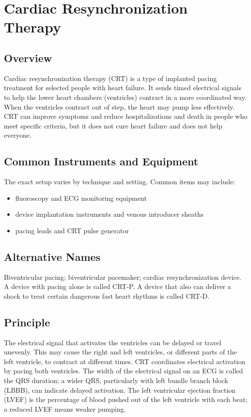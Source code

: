 \chapter{Cardiac Resynchronization Therapy}

\section*{Overview}
Cardiac resynchronization therapy (CRT) is a type of implanted pacing treatment for selected people with heart failure. It sends timed electrical signals to help the lower heart chambers (ventricles) contract in a more coordinated way. When the ventricles contract out of step, the heart may pump less effectively. CRT can improve symptoms and reduce hospitalizations and death in people who meet specific criteria, but it does not cure heart failure and does not help everyone.

\section*{Common Instruments and Equipment}
The exact setup varies by technique and setting. Common items may include:
\begin{itemize}[nosep,leftmargin=*]
  \item fluoroscopy and ECG monitoring equipment
  \item device implantation instruments and venous introducer sheaths
  \item pacing leads and CRT pulse generator
\end{itemize}

\section*{Alternative Names}
Biventricular pacing; biventricular pacemaker; cardiac resynchronization device. A device with pacing alone is called CRT-P. A device that also can deliver a shock to treat certain dangerous fast heart rhythms is called CRT-D.

\section*{Principle}
The electrical signal that activates the ventricles can be delayed or travel unevenly. This may cause the right and left ventricles, or different parts of the left ventricle, to contract at different times. CRT coordinates electrical activation by pacing both ventricles. The width of the electrical signal on an ECG is called the QRS duration; a wider QRS, particularly with left bundle branch block (LBBB), can indicate delayed activation. The left ventricular ejection fraction (LVEF) is the percentage of blood pushed out of the left ventricle with each beat; a reduced LVEF means weaker pumping.

